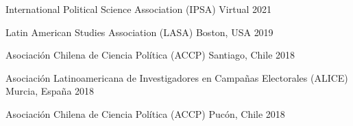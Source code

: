 \begin{cvhonors}
\cvconf
{International Political Science Association (IPSA)} 
{Virtual}
{2021}
\end{cvhonors}

\begin{cvhonors}
\cvconf
{Latin American Studies Association (LASA)} 
{Boston, USA}
{2019}
\end{cvhonors}

\begin{cvhonors}
\cvconf
{Asociación Chilena de Ciencia Política (ACCP)} 
{Santiago, Chile}
{2018}
\end{cvhonors}

\begin{cvhonors}
\cvconf
{Asociación Latinoamericana de Investigadores en Campañas Electorales (ALICE)} 
{Murcia, España}
{2018}
\end{cvhonors}

\begin{cvhonors}
\cvconf
{Asociación Chilena de Ciencia Política (ACCP)} 
{Pucón, Chile}
{2018}
\end{cvhonors}







